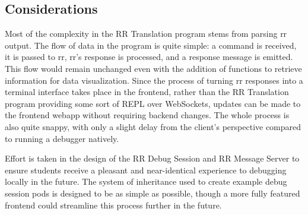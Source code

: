 \documentclass[12pt]{article}
\begin{document}
\subsection{Considerations}

Most of the complexity in the RR Translation program stems from
parsing rr output.  The flow of data in the program is quite simple: a
command is received, it is passed to rr, rr's response is processed,
and a response message is emitted.  This flow would remain unchanged
even with the addition of functions to retrieve information for data
visualization.  Since the process of turning rr responses into a
terminal interface takes place in the frontend, rather than the RR
Translation program providing some sort of REPL over WebSockets,
updates can be made to the frontend webapp without requiring backend
changes.  The whole process is also quite snappy, with only a slight
delay from the client's perspective compared to running a debugger
natively.
\par

Effort is taken in the design of the RR Debug Session and RR Message
Server to ensure students receive a pleasant and near-identical
experience to debugging locally in the future.  The system of
inheritance used to create example debug session pods is designed to
be as simple as possible, though a more fully featured frontend could
streamline this process further in the future.





\end{document}

